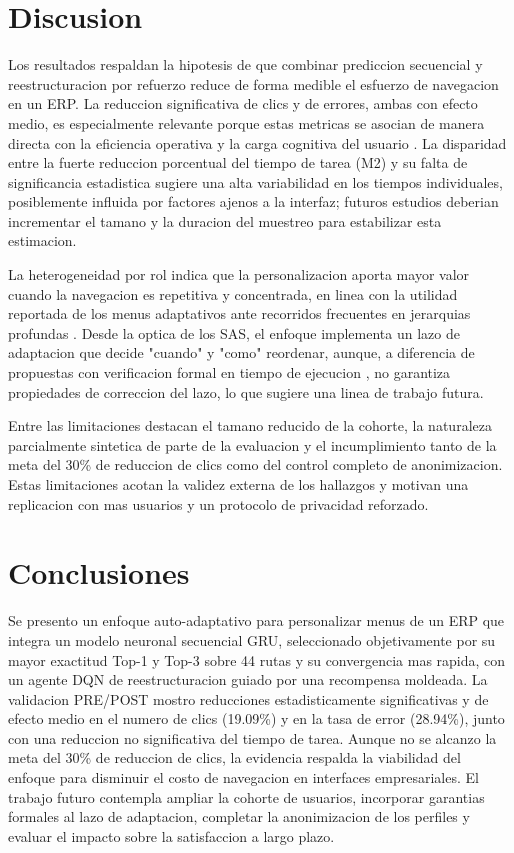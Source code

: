 \documentclass[conference]{IEEEtran}
\begin{document}
\section{Discusion}
Los resultados respaldan la hipotesis de que combinar prediccion secuencial y reestructuracion por refuerzo reduce de forma medible el esfuerzo de navegacion en un ERP. La reduccion significativa de clics y de errores, ambas con efecto medio, es especialmente relevante porque estas metricas se asocian de manera directa con la eficiencia operativa y la carga cognitiva del usuario \cite{b_balasm}. La disparidad entre la fuerte reduccion porcentual del tiempo de tarea (M2) y su falta de significancia estadistica sugiere una alta variabilidad en los tiempos individuales, posiblemente influida por factores ajenos a la interfaz; futuros estudios deberian incrementar el tamano y la duracion del muestreo para estabilizar esta estimacion.

La heterogeneidad por rol indica que la personalizacion aporta mayor valor cuando la navegacion es repetitiva y concentrada, en linea con la utilidad reportada de los menus adaptativos ante recorridos frecuentes en jerarquias profundas \cite{b_fractal}. Desde la optica de los SAS, el enfoque implementa un lazo de adaptacion que decide "cuando" y "como" reordenar, aunque, a diferencia de propuestas con verificacion formal en tiempo de ejecucion \cite{b_activforms}, no garantiza propiedades de correccion del lazo, lo que sugiere una linea de trabajo futura.

Entre las limitaciones destacan el tamano reducido de la cohorte, la naturaleza parcialmente sintetica de parte de la evaluacion y el incumplimiento tanto de la meta del 30\% de reduccion de clics como del control completo de anonimizacion. Estas limitaciones acotan la validez externa de los hallazgos y motivan una replicacion con mas usuarios y un protocolo de privacidad reforzado.

\section{Conclusiones}
Se presento un enfoque auto-adaptativo para personalizar menus de un ERP que integra un modelo neuronal secuencial GRU, seleccionado objetivamente por su mayor exactitud Top-1 y Top-3 sobre 44 rutas y su convergencia mas rapida, con un agente DQN de reestructuracion guiado por una recompensa moldeada. La validacion PRE/POST mostro reducciones estadisticamente significativas y de efecto medio en el numero de clics (19.09\%) y en la tasa de error (28.94\%), junto con una reduccion no significativa del tiempo de tarea. Aunque no se alcanzo la meta del 30\% de reduccion de clics, la evidencia respalda la viabilidad del enfoque para disminuir el costo de navegacion en interfaces empresariales. El trabajo futuro contempla ampliar la cohorte de usuarios, incorporar garantias formales al lazo de adaptacion, completar la anonimizacion de los perfiles y evaluar el impacto sobre la satisfaccion a largo plazo.
\end{document}

